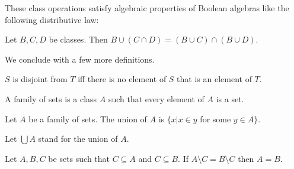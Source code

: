 \documentclass{article}
\begin{document}
These class operations satisfy algebraic properties of Boolean algebras
like the following distributive law:
\begin{forthel}

\begin{proposition}
Let $B,C,D$ be classes. Then
$B \cup (C \cap D) = (B \cup C) \cap (B \cup D)$.
\end{proposition}
\end{forthel}
%
We conclude with a few more definitions.
%
\begin{forthel}
  \begin{definition}
    $S$ is disjoint from $T$ iff there is no element of $S$ that is an element
    of $T$.
  \end{definition}

  \begin{definition}
    A family of sets is a class $A$ such that every element of
$A$ is a set.
  \end{definition}

\begin{definition}
Let $A$ be a family of sets. The union of $A$
is $ \{x | x \in y$ for some $y \in A\}$.
\end{definition}

Let $\bigcup A$ stand for the union of $A$.


\begin{lemma}
Let $A,B,C$ be sets such that $C \subseteq A$ and $C \subseteq B$.
If $A \setminus C = B \setminus C$ then $A = B$.
\end{lemma}


\end{forthel}
%
\end{document}
